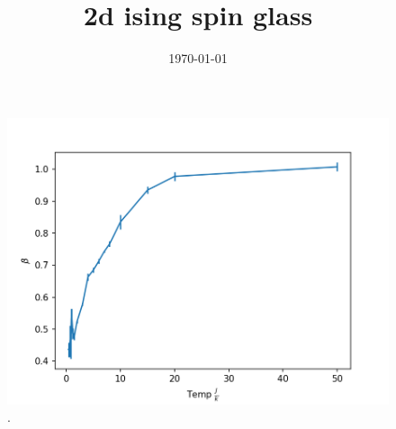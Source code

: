 \documentclass{article}
\title{2d ising spin glass}
\author{}
\date{\today}
\begin{document}
\maketitle

\section*{}
 
    \begin{figure}[h!!!]
    		\includegraphics[width=\linewidth]{pics/beta0_large.png}
    		\caption{.}
    		\centering
    \end{figure}
    
\end{document}
